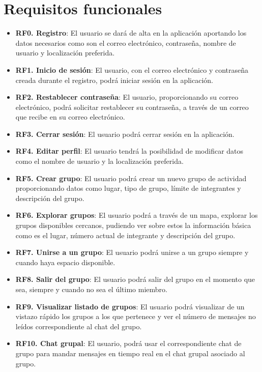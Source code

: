 \section{Requisitos funcionales}
        \begin{itemize}
            \item \textbf{RF0. Registro}: El usuario se dará de alta en la aplicación aportando los datos necesarios como son el correo electrónico, contraseña, nombre de usuario y localización preferida.
            \item \textbf{RF1. Inicio de sesión}: El usuario, con el correo electrónico y contraseña creada durante el registro, podrá iniciar sesión en la aplicación.
            \item \textbf{RF2. Restablecer contraseña}: El usuario, proporcionando su correo electrónico, podrá solicitar restablecer su contraseña, a través de un correo que recibe en su correo electrónico.
            \item \textbf{RF3. Cerrar sesión}: El usuario podrá cerrar sesión en la aplicación.
            \item \textbf{RF4. Editar perfil}: El usuario tendrá la posibilidad de modificar datos como el nombre de usuario y la localización preferida.
            \item \textbf{RF5. Crear grupo}: El usuario podrá crear un nuevo grupo de actividad proporcionando datos como lugar, tipo de grupo, límite de integrantes y descripción del grupo.
            \item \textbf{RF6. Explorar grupos}: El usuario podrá a través de un mapa, explorar los grupos disponibles cercanos, pudiendo ver sobre estos la información básica como es el lugar, número actual de integrante y descripción del grupo.
            \item \textbf{RF7. Unirse a un grupo}: El usuario podrá unirse a un grupo siempre y cuando haya espacio disponible.
            \item \textbf{RF8. Salir del grupo}: El usuario podrá salir del grupo en el momento que sea, siempre y cuando no sea el último miembro.
            \item \textbf{RF9. Visualizar listado de grupos}: El usuario podrá visualizar de un vistazo rápido los grupos a los que pertenece y ver el número de mensajes no leídos correspondiente al chat del grupo.
            \item \textbf{RF10. Chat grupal}: El usuario, podrá usar el correspondiente chat de grupo para mandar mensajes en tiempo real en el chat grupal asociado al grupo.

\end{itemize}
